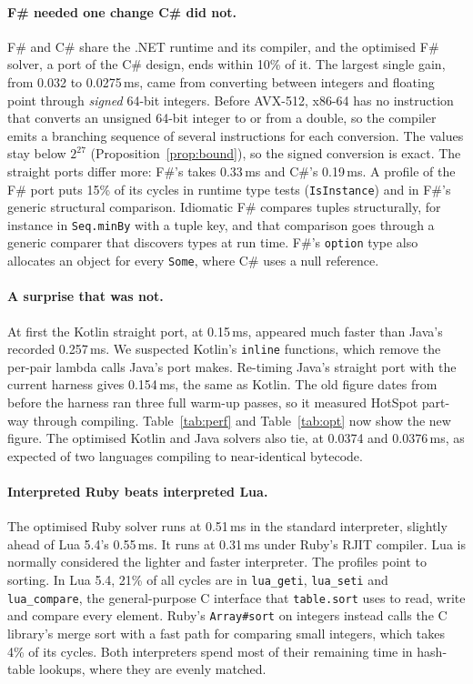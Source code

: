 \documentclass[11pt,a4paper]{article}
\theoremstyle{definition}
\theoremstyle{remark}
\begin{document}
\paragraph{F\# needed one change C\# did not.}
F\# and C\# share the .NET runtime and its compiler, and the optimised F\# solver, a port of the C\# design,
ends within 10\% of it. The largest single gain, from 0.032 to 0.0275\,ms, came from converting between
integers and floating point through \emph{signed} 64-bit integers. Before AVX-512, x86-64 has no instruction
that converts an unsigned 64-bit integer to or from a double, so the compiler emits a branching sequence of
several instructions for each conversion. The values stay below $2^{27}$
(Proposition~\ref{prop:bound}), so the signed conversion is exact. The straight ports differ more:
F\#'s takes 0.33\,ms and C\#'s 0.19\,ms. A profile of the F\# port puts 15\% of its cycles in runtime type
tests (\texttt{IsInstance}) and in F\#'s generic structural comparison. Idiomatic F\# compares tuples
structurally, for instance in \texttt{Seq.minBy} with a tuple key, and that comparison goes through a
generic comparer that discovers types at run time. F\#'s \texttt{option} type also allocates an object for
every \texttt{Some}, where C\# uses a null reference.

\paragraph{A surprise that was not.}
At first the Kotlin straight port, at 0.15\,ms, appeared much faster than Java's recorded 0.257\,ms. We
suspected Kotlin's \texttt{inline} functions, which remove the per-pair lambda calls Java's port makes.
Re-timing Java's straight port with the current harness gives 0.154\,ms, the same as Kotlin. The old figure
dates from before the harness ran three full warm-up passes, so it measured HotSpot part-way through compiling.
Table~\ref{tab:perf} and Table~\ref{tab:opt} now show the new figure. The optimised Kotlin and Java solvers also tie,
at 0.0374 and 0.0376\,ms, as expected of two languages compiling to near-identical bytecode.

\paragraph{Interpreted Ruby beats interpreted Lua.}
The optimised Ruby solver runs at 0.51\,ms in the standard interpreter, slightly ahead of Lua 5.4's 0.55\,ms.
It runs at 0.31\,ms under Ruby's RJIT compiler. Lua is normally considered the lighter and faster interpreter. The
profiles point to sorting. In Lua 5.4, 21\% of all cycles are in \texttt{lua\_geti}, \texttt{lua\_seti} and
\texttt{lua\_compare}, the general-purpose C interface that \texttt{table.sort} uses to read, write and
compare every element. Ruby's \texttt{Array\#sort} on integers instead calls the C library's merge sort with
a fast path for comparing small integers, which takes 4\% of its cycles. Both interpreters spend most of
their remaining time in hash-table lookups, where they are evenly matched.
\end{document}
